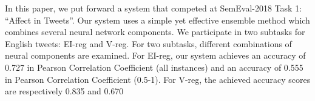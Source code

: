 In this paper, we put forward a system that competed at SemEval-2018 Task 1: ``Affect in Tweets''. Our system uses a simple yet effective ensemble method which combines several neural network components. We participate in two subtasks for English tweets: EI-reg and V-reg. For two subtasks, different combinations of neural components are examined. For EI-reg, our system achieves an accuracy of 0.727 in Pearson Correlation Coefficient (all instances) and an accuracy of 0.555 in Pearson Correlation Coefficient (0.5-1). For V-reg, the achieved accuracy scores are respectively 0.835 and 0.670
